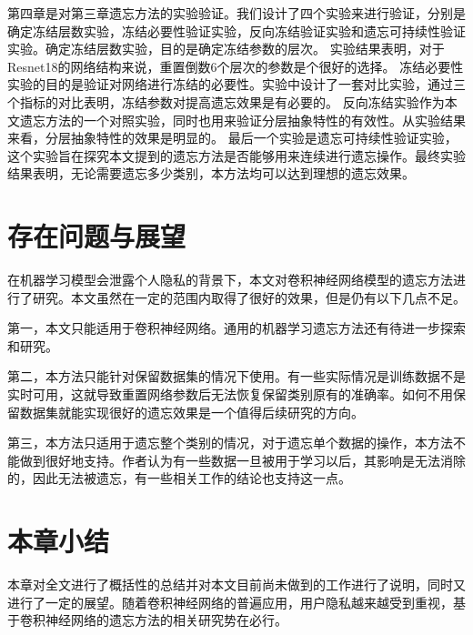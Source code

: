 第四章是对第三章遗忘方法的实验验证。我们设计了四个实验来进行验证，分别是确定冻结层数实验，冻结必要性验证实验，反向冻结验证实验和遗忘可持续性验证实验。确定冻结层数实验，目的是确定冻结参数的层次。
实验结果表明，对于Resnet18的网络结构来说，重置倒数6个层次的参数是个很好的选择。
冻结必要性实验的目的是验证对网络进行冻结的必要性。实验中设计了一套对比实验，通过三个指标的对比表明，冻结参数对提高遗忘效果是有必要的。
反向冻结实验作为本文遗忘方法的一个对照实验，同时也用来验证分层抽象特性的有效性。从实验结果来看，分层抽象特性的效果是明显的。
最后一个实验是遗忘可持续性验证实验，这个实验旨在探究本文提到的遗忘方法是否能够用来连续进行遗忘操作。最终实验结果表明，无论需要遗忘多少类别，本方法均可以达到理想的遗忘效果。

\section{存在问题与展望}
在机器学习模型会泄露个人隐私的背景下，本文对卷积神经网络模型的遗忘方法进行了研究。本文虽然在一定的范围内取得了很好的效果，但是仍有以下几点不足。

第一，本文只能适用于卷积神经网络。通用的机器学习遗忘方法还有待进一步探索和研究。

第二，本方法只能针对保留数据集的情况下使用。有一些实际情况是训练数据不是实时可用，这就导致重置网络参数后无法恢复保留类别原有的准确率。如何不用保留数据集就能实现很好的遗忘效果是一个值得后续研究的方向。

第三，本方法只适用于遗忘整个类别的情况，对于遗忘单个数据的操作，本方法不能做到很好地支持。作者认为有一些数据一旦被用于学习以后，其影响是无法消除的，因此无法被遗忘，有一些相关工作\cite{2018arXiv181205159T}的结论也支持这一点。

\section{本章小结}
本章对全文进行了概括性的总结并对本文目前尚未做到的工作进行了说明，同时又进行了一定的展望。随着卷积神经网络的普遍应用，用户隐私越来越受到重视，基于卷积神经网络的遗忘方法的相关研究势在必行。